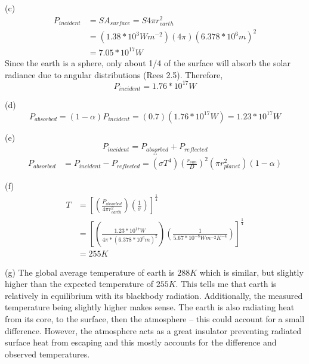 \documentclass{homework}
\begin{document}
(c)
\begin{equation*}
    \begin{split}
        P_{incident} 
        & = SA_{surface} = S4 \pi r^2_{earth} \\
        & = (1.38*10^3 Wm^{-2})(4 \pi)(6.378*10^6 m)^2 \\
        & = 7.05*10^{17} W 
    \end{split}
\end{equation*}
Since the earth is a sphere, only about 1/4 of the surface will absorb the solar radiance due to angular distributions (Rees 2.5). Therefore, 
\begin{equation*}
    P_{incident} = 1.76*10^{17} W
\end{equation*}

(d) 
\begin{equation*}
    P_{absorbed} = (1-\alpha) P_{incident} = (0.7)(1.76*10^{17} W) = 1.23*10^{17} W
\end{equation*}

(e)
\begin{equation*} P_{incident} = P_{absorbed} + P_{reflected} \end{equation*}
\begin{equation*} \therefore \end{equation*}
\begin{equation*}
    \begin{split}
        P_{absorbed} 
            & = P_{incident} - P_{reflected} = (\sigma T^4) (\frac{r_{sun}}{D})^2 (\pi r^2_{planet})(1-\alpha)
    \end{split}
\end{equation*}

(f)
\begin{equation*}
    \begin{split}
        T 
            & =\left[ (\frac{P_{absorbed}}{4\pi r^2_{earth}})(\frac{1}{\sigma})             
            \right]^\frac{1}{4} \\
            & =\left[ (\frac{1.23*10^{17}W}{4\pi*(6.378*10^{6}m)^2})(\frac{1}{5.67*10^{-8} Wm^{-2}K^{-4}}) \right]^\frac{1}{4} \\
            & = 255 K
    \end{split}
\end{equation*}

(g)
The global average temperature of earth is $288K$ which is similar, but slightly higher than the expected temperature of $255K$. This tells me that earth is relatively in equilibrium with its blackbody radiation. Additionally, the measured temperature being slightly higher makes sense. The earth is also radiating heat from its core, to the surface, then the atmosphere -- this could account for a small difference. However, the atmosphere acts as a great insulator preventing radiated surface heat from escaping and this mostly accounts for the difference and observed temperatures.\\
\end{document}
